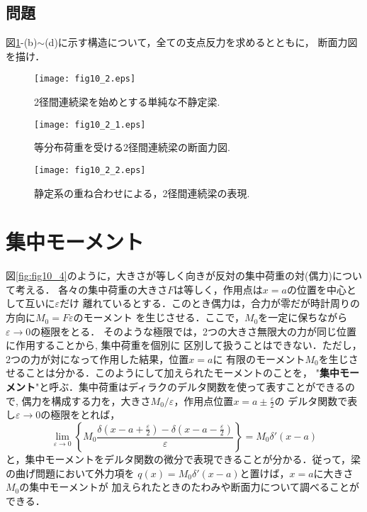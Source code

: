 \documentclass[10pt,a4j]{jarticle}
\begin{document}
\subsection{問題}
図\ref{fig:fig10_2}-(b)$\sim$(d)に示す構造について，全ての支点反力を求めるとともに，
断面力図を描け．
\begin{figure}[h]
	\begin{center}
	\texttt{[image: fig10\_2.eps]} 
	\end{center}
	\caption{
		2径間連続梁を始めとする単純な不静定梁.
	} 
	\label{fig:fig10_2}
\end{figure}
\begin{figure}[h]
	\begin{center}
	\texttt{[image: fig10\_2\_1.eps]} 
	\end{center}
	\caption{
		等分布荷重を受ける2径間連続梁の断面力図.
	} 
	\label{fig:fig10_2_1}
\end{figure}
\begin{figure}[h]
	\begin{center}
	\texttt{[image: fig10\_2\_2.eps]} 
	\end{center}
	\caption{
		静定系の重ね合わせによる，2径間連続梁の表現.
	} 
	\label{fig:fig10_2_2}
\end{figure}
\section{集中モーメント}
図\ref{fig:fig10_4}のように，大きさが等しく向きが反対の集中荷重の対(偶力)について考える．
各々の集中荷重の大きさ$F$は等しく，作用点は$x=a$の位置を中心として互いに$\varepsilon$だけ
離れているとする．このとき偶力は，合力が零だが時計周りの方向に$M_0=F\varepsilon$のモーメント
を生じさせる．ここで，$M_0$を一定に保ちながら$\varepsilon \rightarrow 0$の極限をとる．
そのような極限では，2つの大きさ無限大の力が同じ位置に作用することから, 集中荷重を個別に
区別して扱うことはできない．ただし，2つの力が対になって作用した結果，位置$x=a$に
有限のモーメント$M_0$を生じさせることは分かる．このようにして加えられたモーメントのことを，
"{\bf 集中モーメント}"と呼ぶ．集中荷重はディラクのデルタ関数を使って表すことができるので, 
偶力を構成する力を，大きさ$M_0/\varepsilon$，作用点位置$x=a\pm\frac{\varepsilon}{2}$の
デルタ関数で表し$\varepsilon \rightarrow 0$の極限をとれば，
\begin{equation}
	\lim_{\varepsilon \rightarrow 0} 
	\left\{
	M_0\frac{
		\delta\left(x-a+\frac{\varepsilon}{2}\right)
		-
		\delta\left(x-a-\frac{\varepsilon}{2}\right)
	}{\varepsilon}
	\right\}
	=M_0 \delta '\left( x-a \right)
\end{equation}
と，集中モーメントをデルタ関数の微分で表現できることが分かる．従って，梁の曲げ問題において外力項を
$q(x)=M_0\delta'\left(x-a\right)$と置けば，$x=a$に大きさ$M_0$の集中モーメントが
加えられたときのたわみや断面力について調べることができる．
\end{document}
